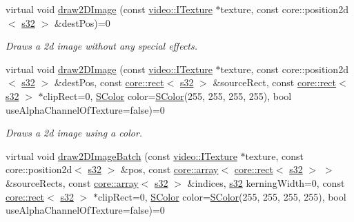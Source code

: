 \begin{DoxyCompactItemize}
virtual void \hyperlink{classirr_1_1video_1_1IVideoDriver_ac1f12aefefb24414e03876bca942fb02}{draw2\+D\+Image} (const \hyperlink{classirr_1_1video_1_1ITexture}{video\+::\+I\+Texture} $\ast$texture, const core\+::position2d$<$ \hyperlink{namespaceirr_ac66849b7a6ed16e30ebede579f9b47c6}{s32} $>$ \&dest\+Pos)=0
\begin{DoxyCompactList}\small\item\em Draws a 2d image without any special effects. \end{DoxyCompactList}\item 
virtual void \hyperlink{classirr_1_1video_1_1IVideoDriver_a167d3a5e2ea5804bfa9ba9e526bbcdb3}{draw2\+D\+Image} (const \hyperlink{classirr_1_1video_1_1ITexture}{video\+::\+I\+Texture} $\ast$texture, const core\+::position2d$<$ \hyperlink{namespaceirr_ac66849b7a6ed16e30ebede579f9b47c6}{s32} $>$ \&dest\+Pos, const \hyperlink{classirr_1_1core_1_1rect}{core\+::rect}$<$ \hyperlink{namespaceirr_ac66849b7a6ed16e30ebede579f9b47c6}{s32} $>$ \&source\+Rect, const \hyperlink{classirr_1_1core_1_1rect}{core\+::rect}$<$ \hyperlink{namespaceirr_ac66849b7a6ed16e30ebede579f9b47c6}{s32} $>$ $\ast$clip\+Rect=0, \hyperlink{classirr_1_1video_1_1SColor}{S\+Color} color=\hyperlink{classirr_1_1video_1_1SColor}{S\+Color}(255, 255, 255, 255), bool use\+Alpha\+Channel\+Of\+Texture=false)=0
\begin{DoxyCompactList}\small\item\em Draws a 2d image using a color. \end{DoxyCompactList}\item 
virtual void \hyperlink{classirr_1_1video_1_1IVideoDriver_a1b7647e900a56f23abb0809fd533617e}{draw2\+D\+Image\+Batch} (const \hyperlink{classirr_1_1video_1_1ITexture}{video\+::\+I\+Texture} $\ast$texture, const core\+::position2d$<$ \hyperlink{namespaceirr_ac66849b7a6ed16e30ebede579f9b47c6}{s32} $>$ \&pos, const \hyperlink{classirr_1_1core_1_1array}{core\+::array}$<$ \hyperlink{classirr_1_1core_1_1rect}{core\+::rect}$<$ \hyperlink{namespaceirr_ac66849b7a6ed16e30ebede579f9b47c6}{s32} $>$ $>$ \&source\+Rects, const \hyperlink{classirr_1_1core_1_1array}{core\+::array}$<$ \hyperlink{namespaceirr_ac66849b7a6ed16e30ebede579f9b47c6}{s32} $>$ \&indices, \hyperlink{namespaceirr_ac66849b7a6ed16e30ebede579f9b47c6}{s32} kerning\+Width=0, const \hyperlink{classirr_1_1core_1_1rect}{core\+::rect}$<$ \hyperlink{namespaceirr_ac66849b7a6ed16e30ebede579f9b47c6}{s32} $>$ $\ast$clip\+Rect=0, \hyperlink{classirr_1_1video_1_1SColor}{S\+Color} color=\hyperlink{classirr_1_1video_1_1SColor}{S\+Color}(255, 255, 255, 255), bool use\+Alpha\+Channel\+Of\+Texture=false)=0

\end{DoxyCompactItemize}
